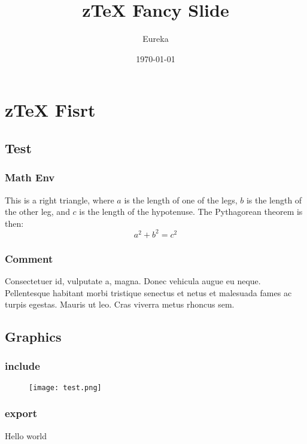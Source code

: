 \documentclass[
  class=book,
  mathSpec={envStyle=paris},
  layout={slide, aspect=16|9},
]{zlatex}
\title{z\TeX{} Fancy Slide}
\author{Eureka}
\date{\today}
\begin{document}
\maketitle
\thispagestyle{fancy}
\tableofcontents
\newpage

\chapter{z\TeX{} Fisrt}
\section{Test}
\subsection{Math Env}
\begin{theorem}\label{pythagorean}
  This is a right triangle, where $a$ is the length of one of the legs, $b$ is the length of the other leg, 
  and $c$ is the length of the hypotenuse. The Pythagorean theorem is then:
  \begin{equation}
    a^2 + b^2 = c^2
  \end{equation}
\end{theorem}


\subsection{Comment}
Consectetuer id, vulputate a, magna. Donec vehicula augue eu neque. Pellentesque habitant
morbi tristique senectus et netus et malesuada fames ac turpis egestas. Mauris ut leo. Cras
viverra metus rhoncus sem.


\section{Graphics}
\subsection{include}
\begin{figure}[!htb]
  \centering
  \texttt{[image: test.png]}
\end{figure}

\lipsum[1]
\subsection{export}
Hello world
\end{document}
